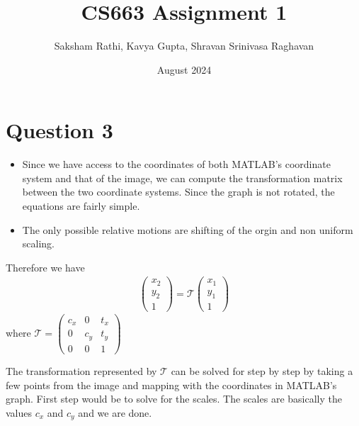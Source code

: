 \documentclass[12pt]{article}
\title{{\bf CS663 Assignment 1}}
\author{Saksham Rathi, Kavya Gupta, Shravan Srinivasa Raghavan}
\date{August 2024}
\begin{document}
\maketitle
\clearpage
\tableofcontents
\clearpage

\section*{Question 3}
    \begin{itemize}
        \item Since we have access to the coordinates of both MATLAB's coordinate system and that of the image, we can compute the 
        transformation matrix between the two coordinate systems. Since the graph is not rotated, the equations are fairly 
        simple.
        \item The only possible relative motions are shifting of the orgin and non uniform scaling.
    \end{itemize}

    Therefore we have 
    \begin{align*}
        \begin{pmatrix}
            x_{2} \\
            y_{2} \\
            1
        \end{pmatrix}
        = \mathcal{T} 
        \begin{pmatrix}
            x_{1} \\
            y_{1} \\
            1
        \end{pmatrix}
    \end{align*}
    where $\mathcal{T} = \begin{pmatrix}
                            c_{x} & 0 & t_{x} \\
                            0  & c_{y} & t_{y} \\
                            0 & 0 & 1
                        \end{pmatrix}$

    The transformation represented by $\mathcal{T}$ can be solved for step by step by taking a few points from the image 
    and mapping with the coordinates in MATLAB's graph. First step would be to solve for the scales.
    The scales are basically the values $c_{x}$ and $c_{y}$ and we are done.
    
\end{document}
